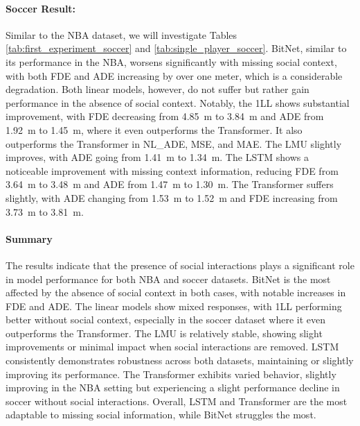 \paragraph {Soccer Result:}
Similar to the NBA dataset, we will investigate Tables \ref{tab:first_experiment_soccer} and \ref{tab:single_player_soccer}. BitNet, similar to its performance in the NBA, worsens significantly with missing social context, with both FDE and ADE increasing by over one meter, which is a considerable degradation. Both linear models, however, do not suffer but rather gain performance in the absence of social context. Notably, the 1LL shows substantial improvement, with FDE decreasing from \SI{4.85}{\meter} to \SI{3.84}{\meter} and ADE from \SI{1.92}{\meter} to \SI{1.45}{\meter}, where it even outperforms the Transformer. It also outperforms the Transformer in NL\_ADE, MSE, and MAE. The LMU slightly improves, with ADE going from \SI{1.41}{\meter} to \SI{1.34}{\meter}. The LSTM shows a noticeable improvement with missing context information, reducing FDE from \SI{3.64}{\meter} to \SI{3.48}{\meter} and ADE from \SI{1.47}{\meter} to \SI{1.30}{\meter}. The Transformer suffers slightly, with ADE changing from \SI{1.53}{\meter} to \SI{1.52}{\meter} and FDE increasing from \SI{3.73}{\meter} to \SI{3.81}{\meter}.

\paragraph{Summary}
The results indicate that the presence of social interactions plays a significant role in model performance for both NBA and soccer datasets. BitNet is the most affected by the absence of social context in both cases, with notable increases in FDE and ADE. The linear models show mixed responses, with 1LL performing better without social context, especially in the soccer dataset where it even outperforms the Transformer. The LMU is relatively stable, showing slight improvements or minimal impact when social interactions are removed. LSTM consistently demonstrates robustness across both datasets, maintaining or slightly improving its performance. The Transformer exhibits varied behavior, slightly improving in the NBA setting but experiencing a slight performance decline in soccer without social interactions. Overall, LSTM and Transformer are the most adaptable to missing social information, while BitNet struggles the most.


